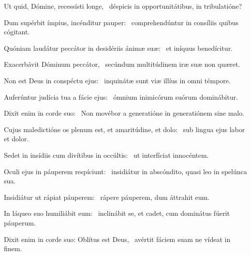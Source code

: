 \item Ut quid, Dómine, recessísti longe,~\psstar{} déspicis in opportunitátibus, in tribulatióne?
\item Dum supérbit ímpius, incénditur pauper:~\psstar{} comprehendúntur in consíliis quibus cógitant.
\item Quóniam laudátur peccátor in desidériis ánimæ suæ:~\psstar{} et iníquus benedícitur.
\item Exacerbávit Dóminum peccátor,~\psstar{} secúndum multitúdinem iræ suæ non quæret.
\item Non est Deus in conspéctu ejus:~\psstar{} inquinátæ sunt viæ illíus in omni témpore.
\item Auferúntur judícia tua a fácie ejus:~\psstar{} ómnium inimicórum suórum dominábitur.
\item Dixit enim in corde suo:~\psstar{} Non movébor a generatióne in generatiónem sine malo.
\item Cujus maledictióne os plenum est, et amaritúdine, et dolo:~\psstar{} sub lingua ejus labor et dolor.
\item Sedet in insídiis cum divítibus in occúltis:~\psstar{} ut interfíciat innocéntem.
\item Oculi ejus in páuperem respíciunt:~\psstar{} insidiátur in abscóndito, quasi leo in spelúnca sua.
\item Insidiátur ut rápiat páupe\-rem:~\psstar{} rápere páuperem, dum áttrahit eum.
\item In láqueo suo humiliábit eum:~\psstar{} inclinábit se, et cadet, cum dominátus fúerit páuperum.
\item Dixit enim in corde suo: Oblítus est Deus,~\psstar{} avértit fáciem suam ne vídeat in finem.
